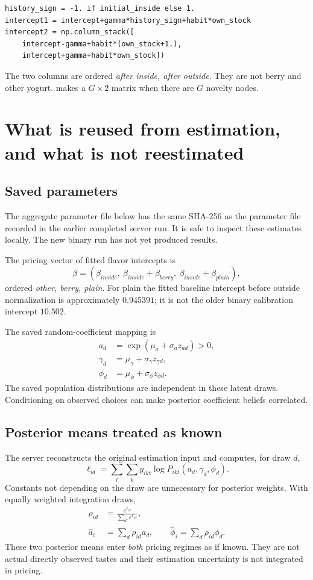 \documentclass[11pt]{article}
\newcommand{\code}[1]{\texttt{\detokenize{#1}}}
\begin{document}
\begin{lstlisting}
history_sign = -1. if initial_inside else 1.
intercept1 = intercept+gamma*history_sign+habit*own_stock
intercept2 = np.column_stack([
    intercept-gamma+habit*(own_stock+1.),
    intercept+gamma+habit*own_stock])
\end{lstlisting}
The two columns are ordered \emph{after inside, after outside}. They are not berry and other yogurt. \code{np.column_stack} makes a $G\times2$ matrix when there are $G$ novelty nodes.

\section{What is reused from estimation, and what is not reestimated}
\subsection{Saved parameters}
The aggregate parameter file below has the same SHA-256 as the parameter file recorded in the earlier completed server run. It is safe to inspect these estimates locally. The new binary run has not yet produced results.


The pricing vector of fitted flavor intercepts is
\[
 \bar\beta=(\beta_{inside},\ \beta_{inside}+\beta_{berry},\ \beta_{inside}+\beta_{plain}),
\]
ordered \emph{other, berry, plain}. For plain the fitted baseline intercept before outside normalization is approximately $0.945391$; it is not the older binary calibration intercept $10.502$.

The saved random-coefficient mapping is
\begin{align}
 a_d&=\exp(\mu_a+\sigma_a z_{ad})>0,\\
 \gamma_d&=\mu_\gamma+\sigma_\gamma z_{\gamma d},\\
 \phi_d&=\mu_\phi+\sigma_\phi z_{\phi d}.
\end{align}
The saved population distributions are independent in these latent draws. Conditioning on observed choices can make posterior coefficient beliefs correlated.

\subsection{Posterior means treated as known}
The server reconstructs the original estimation input and computes, for draw $d$,
\[
 \ell_{id}=\sum_t\sum_k y_{ikt}\log P_{ikt}(a_d,\gamma_d,\phi_d).
\]
Constants not depending on the draw are unnecessary for posterior weights. With equally weighted integration draws,
\begin{align}
 \rho_{id}&=\frac{e^{\ell_{id}}}{\sum_{d'}e^{\ell_{id'}}},\\
 \widehat a_i&=\sum_d\rho_{id}a_d,\qquad
 \widehat\phi_i=\sum_d\rho_{id}\phi_d.\label{eq:postmean}
\end{align}
These two posterior means enter \emph{both} pricing regimes as if known. They are not actual directly observed tastes and their estimation uncertainty is not integrated in pricing.
\end{document}

